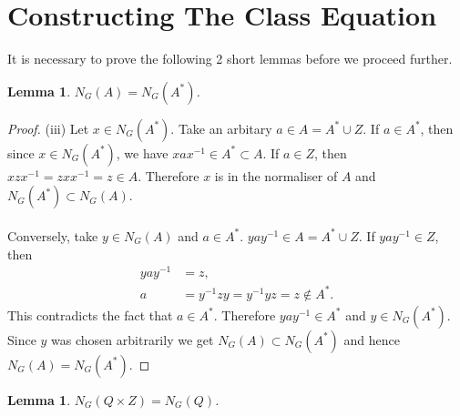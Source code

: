 \documentclass[a4paper , 11pt]{book}
\newtheorem{lemma}[theorem]{Lemma}
\theoremstyle{definition}
\theoremstyle{remark}
\begin{document}
\section{Constructing The Class Equation}

It is necessary to prove the following 2 short lemmas before we proceed further.
 
\begin{lemma}\label{unsureifneeded} $N_G(A) =N_G(A^*)$.
\end{lemma}

\begin{proof}
(iii) Let $x \in N_G(A^*)$. Take an arbitary $a \in A = A^* \cup Z$. If $a \in A^*$, then since  $x \in N_G(A^*)$, we have $xax^{-1} \in A^* \subset A$. If $a \in Z$, then $xzx^{-1} = zxx^{-1} = z \in A$. Therefore $x$ is in the normaliser of $A$ and $N_G(A^*) \subset N_G(A)$. \\
\\
Conversely, take $y \in N_G(A)$ and $a \in A^*$. $yay^{-1} \in A = A^* \cup Z$. If  $yay^{-1} \in Z$, then
\begin{align*} yay^{-1} &= z, \tag{some $z \in Z$}
\\ a &= y^{-1}zy =   y^{-1}yz = z \not \in A^*.
\end{align*}
This contradicts the fact that $a \in A^*$. Therefore $yay^{-1} \in A^*$ and $y \in N_G(A^*)$. Since $y$ was chosen arbitrarily we get $N_G(A) \subset N_G(A^*)$ and hence $N_G(A) =N_G(A^*)$.

\end{proof}

\begin{lemma}\label{unsure} $N_G(Q \times Z) = N_G(Q)$.
\end{lemma}
\end{document}
